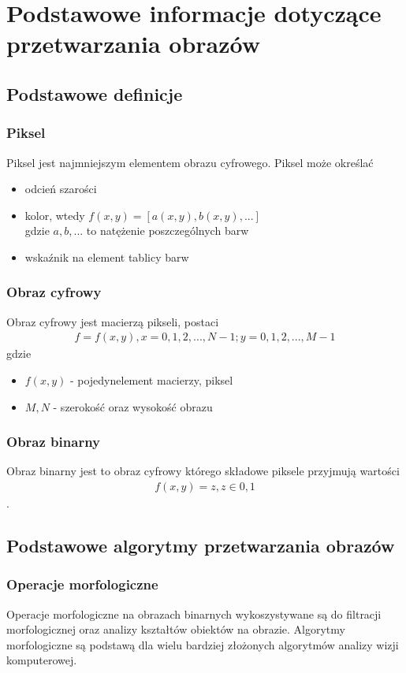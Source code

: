 \section{Podstawowe informacje dotyczące przetwarzania obrazów}
\subsection{Podstawowe definicje}
\subsubsection{Piksel}
Piksel jest najmniejszym elementem obrazu cyfrowego. Piksel może określać
\begin{itemize}
\item odcień szarości
\item kolor, wtedy \(f(x, y) = [a(x, y), b(x, y),...]\)\\
  gdzie $a, b,...$ to natężenie poszczególnych barw
\item wskaźnik na element tablicy barw
\end{itemize}
\subsubsection{Obraz cyfrowy}
Obraz cyfrowy jest macierzą pikseli, postaci
\begin{gather*}
  f = f(x, y), x = 0,1,2,...,N-1; y = 0,1,2,...,M-1
\end{gather*}
gdzie
\begin{itemize}
\item \(f(x, y)\) - pojedynelement macierzy, piksel
\item \(M, N\) - szerokość oraz wysokość obrazu
\end{itemize}
\subsubsection{Obraz binarny}
Obraz binarny jest to obraz cyfrowy którego składowe piksele przyjmują wartości
\begin{gather*}
  f(x, y) = z, z \in {0, 1}
\end{gather*}.
\subsection{Podstawowe algorytmy przetwarzania obrazów}
\subsubsection{Operacje morfologiczne}
Operacje morfologiczne na obrazach binarnych wykoszystywane są do filtracji morfologicznej oraz analizy kształtów obiektów na obrazie. Algorytmy morfologiczne są podstawą dla wielu bardziej złożonych algorytmów analizy wizji komputerowej.
